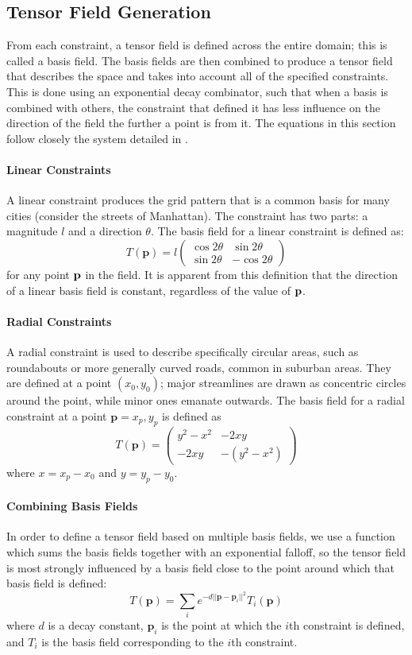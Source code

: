 \documentclass[twocolumn]{article}
\newcommand{\sqmat}[4]{\ensuremath{
    \left(\begin{array}{cc}
        #1 & #2 \\
        #3 & #4
    \end{array}\right)}}
\newcommand{\pt}{\textbf{p}}
\begin{document}
\subsection{Tensor Field Generation}
From each constraint, a tensor field is defined across the entire domain; this
is called a basis field. The basis fields are then combined to produce a tensor
field that describes the space and takes into account all of the specified
constraints. This is done using an exponential decay combinator, such that when
a basis is combined with others, the constraint that defined it has less
influence on the direction of the field the further a point is from it. The
equations in this section follow closely the system detailed in \cite{chen}.

\paragraph{Linear Constraints}
A linear constraint produces the grid pattern that is a common basis for many
cities (consider the streets of Manhattan). The constraint has two parts: a
magnitude $l$ and a direction $\theta$. The basis field for a linear constraint
is defined as:
\[
    T(\pt) =
        l\sqmat{\cos{2\theta}}{\sin{2\theta}}{\sin{2\theta}}{-\cos{2\theta}}
\]
for any point $\bf p$ in the field. It is apparent from this definition that
the direction of a linear basis field is constant, regardless of the value of
$\bf p$.

\paragraph{Radial Constraints}
A radial constraint is used to describe specifically circular areas, such as
roundabouts or more generally curved roads, common in suburban areas. They are
defined at a point $(x_0,y_0)$; major streamlines are drawn as concentric
circles around the point, while minor ones emanate outwards. The basis field
for a radial constraint at a point $\pt=x_p,y_p$ is defined as
\[
    T(\pt) = \sqmat{y^2-x^2}{-2xy}{-2xy}{-(y^2-x^2)}
\]
where $x=x_p-x_0$ and $y=y_p-y_0$.

\paragraph{Combining Basis Fields}
In order to define a tensor field based on multiple basis fields, we use a
function which sums the basis fields together with an exponential falloff,
so the tensor field is most strongly influenced by a basis field close to
the point around which that basis field is defined:
\[
    T(\pt) = \sum_i e^{-d||\pt-\pt_i||^2}T_i(\pt)
\]
where $d$ is a decay constant, $\pt_i$ is the point at which the $i$th
constraint is defined, and $T_i$ is the basis field corresponding to the $i$th
constraint.
\end{document}
